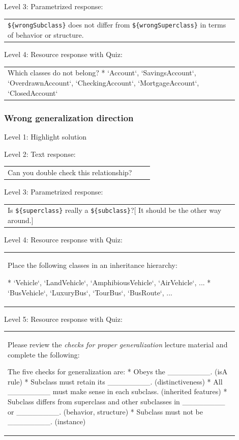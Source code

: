 \noindent Level 3: Parametrized response: \medskip

\begin{tabular}{|p{0.9\linewidth}}
\verb|${wrongSubclass}| does not differ from \verb|${wrongSuperclass}| in terms of behavior or structure.
\end{tabular} \medskip

\noindent Level 4: Resource response with Quiz: \medskip

\begin{tabular}{|p{0.9\linewidth}}
Which classes do not belong?
* `Account`, `SavingsAccount`, `OverdrawnAccount`, `CheckingAccount`, `MortgageAccount`,
`ClosedAccount`
\end{tabular} \medskip


\subsubsection{Wrong generalization direction}

\noindent Level 1: Highlight solution \medskip

\noindent Level 2: Text response: \medskip

\begin{tabular}{|p{0.9\linewidth}}
Can you double check this relationship?
\end{tabular} \medskip

\noindent Level 3: Parametrized response: \medskip

\begin{tabular}{|p{0.9\linewidth}}
Is \verb|${superclass}| really a \verb|${subclass}|?[ It should be the other way around.]
\end{tabular} \medskip

\noindent Level 4: Resource response with Quiz: \medskip

\begin{tabular}{|p{0.9\linewidth}}
Place the following classes in an inheritance hierarchy:

* `Vehicle`, `LandVehicle`, `AmphibiousVehicle`, `AirVehicle`, ...
* `BusVehicle`, `LuxuryBus`, `TourBus`, `BusRoute`, ...
\end{tabular} \medskip

\noindent Level 5: Resource response with Quiz: \medskip

\begin{tabular}{|p{0.9\linewidth}}
Please review the \textit{checks for proper generalization} lecture material
and complete the following:

The five checks for generalization are:
* Obeys the ________. (isA rule)
* Subclass must retain its ________. (distinctiveness)
* All ________ must make sense in each subclass. (inherited features)
* Subclass differs from superclass and other subclasses in ________ or ________. 
(behavior, structure)
* Subclass must not be ________. (instance)
\end{tabular} \medskip


